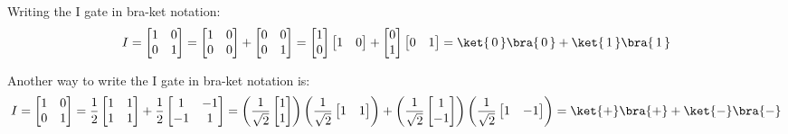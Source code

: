 \documentclass{article}
\theoremstyle{definition}
\newcommand{\kz}[1]{\ket{\,#1\,}}
\newcommand{\kx}[1]{\ket{#1}}
\newcommand{\bz}[1]{\bra{\,#1\,}}
\newcommand{\bx}[1]{\bra{#1}}
\begin{document}
Writing the I gate in bra-ket notation:
\begin{equation}
	I = \begin{bmatrix}
		1 & 0\\
		0 & 1
	\end{bmatrix} = \begin{bmatrix}
		1 & 0\\
		0 & 0
	\end{bmatrix} + \begin{bmatrix}
		0 & 0\\
		0 & 1
	\end{bmatrix} = \begin{bmatrix}
		1\\
		0
	\end{bmatrix} \begin{bmatrix}
		1 & 0
	\end{bmatrix} + \begin{bmatrix}
		0\\
		1
	\end{bmatrix} \begin{bmatrix}
		0 & 1
	\end{bmatrix} = \kz{0}\bz{0} + \kz{1}\bz{1}
\end{equation}

Another way to write the I gate in bra-ket notation is:
\begin{equation}
	I = \begin{bmatrix}
		1 & 0\\
		0 & 1
	\end{bmatrix} = \frac{1}{2}\begin{bmatrix}
		1 & 1\\
		1 & 1
	\end{bmatrix} + \frac{1}{2}\begin{bmatrix}
		1 & -1\\
		-1 & 1
	\end{bmatrix} = \left(\frac{1}{\sqrt{2}}\begin{bmatrix}
		1\\
		1
	\end{bmatrix}\right) \left(\frac{1}{\sqrt{2}}\begin{bmatrix}
		1 & 1
	\end{bmatrix}\right) + \left(\frac{1}{\sqrt{2}}\begin{bmatrix}
		1\\
		-1
	\end{bmatrix}\right) \left(\frac{1}{\sqrt{2}}\begin{bmatrix}
		1 & -1
	\end{bmatrix}\right) = \kx{+}\bx{+} + \kx{-}\bx{-}
\end{equation}
\end{document}
